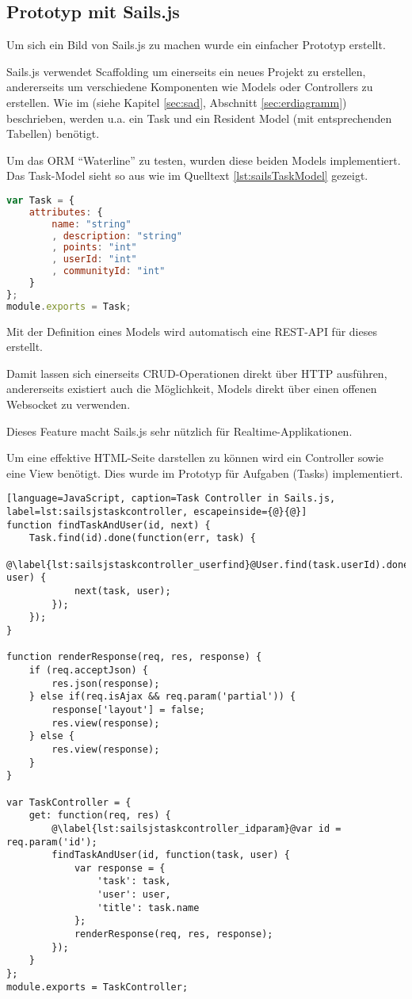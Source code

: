 \subsection{Prototyp mit Sails.js}
Um sich ein Bild von Sails.js zu machen wurde ein einfacher Prototyp \cite{SailsPrototyp} erstellt.

Sails.js verwendet \gls{Scaffolding} um einerseits ein neues Projekt zu erstellen, andererseits  um verschiedene Komponenten wie Models oder Controllers zu erstellen. Wie im  (siehe Kapitel \ref{sec:sad}, Abschnitt \ref{sec:erdiagramm}) beschrieben, werden u.a. ein Task und ein Resident Model (mit entsprechenden Tabellen) benötigt.

Um das \gls{ORM} ``Waterline'' \cite{Waterline} zu testen, wurden diese beiden Models implementiert. Das Task-Model sieht so aus wie im Quelltext \ref{lst:sailsTaskModel} gezeigt.

\begin{lstlisting}[language=JavaScript, caption=Task Model in Sails.js, label=lst:sailsTaskModel]
var Task = {
	attributes: {
		name: "string"
		, description: "string"
		, points: "int"
		, userId: "int"
		, communityId: "int"
	}
};
module.exports = Task;
\end{lstlisting}

Mit der Definition eines Models wird automatisch eine \gls{REST}-API für dieses erstellt.

Damit lassen sich einerseits CRUD-Operationen direkt über HTTP ausführen, andererseits existiert auch die Möglichkeit, Models direkt über einen offenen \gls{Websocket} zu verwenden.

Dieses Feature macht Sails.js sehr nützlich für \gls{Realtime}-Applikationen.

Um eine effektive HTML-Seite darstellen zu können wird ein Controller sowie eine View benötigt. Dies wurde im Prototyp für Aufgaben (Tasks) implementiert.

\newpage
\begin{lstlisting}[language=JavaScript, caption=Task Controller in Sails.js, label=lst:sailsjstaskcontroller, escapeinside={@}{@}]
function findTaskAndUser(id, next) {
	Task.find(id).done(function(err, task) {
		@\label{lst:sailsjstaskcontroller_userfind}@User.find(task.userId).done(function(err, user) {
			next(task, user);
		});
	});
}

function renderResponse(req, res, response) {
	if (req.acceptJson) {
		res.json(response);
	} else if(req.isAjax && req.param('partial')) {
		response['layout'] = false;
		res.view(response);
	} else {
		res.view(response);
	}
}

var TaskController = {
	get: function(req, res) {
		@\label{lst:sailsjstaskcontroller_idparam}@var id = req.param('id');
		findTaskAndUser(id, function(task, user) {
			var response = {
				'task': task,
				'user': user,
				'title': task.name
			};
			renderResponse(req, res, response);
		});
	}
};
module.exports = TaskController;
\end{lstlisting}

